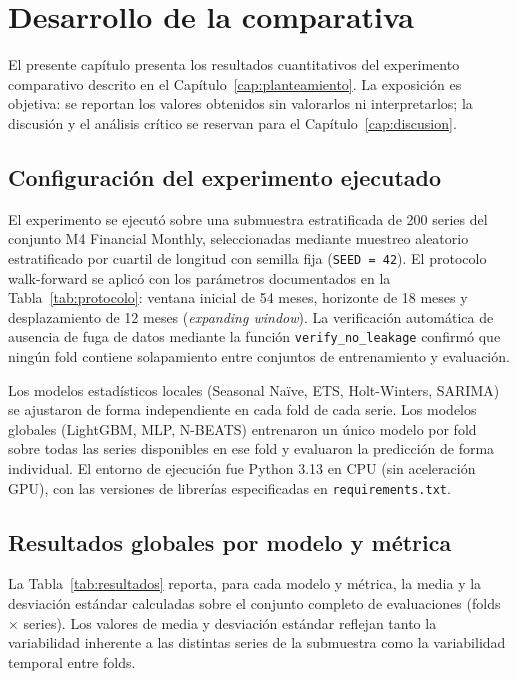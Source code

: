 \chapter{Desarrollo de la comparativa}
\label{cap:resultados}

El presente capítulo presenta los resultados cuantitativos del experimento comparativo descrito en el Capítulo~\ref{cap:planteamiento}. La exposición es objetiva: se reportan los valores obtenidos sin valorarlos ni interpretarlos; la discusión y el análisis crítico se reservan para el Capítulo~\ref{cap:discusion}.

\section{Configuración del experimento ejecutado}
\label{sec:configuracion_ejecucion}

El experimento se ejecutó sobre una submuestra estratificada de 200 series del conjunto M4 Financial Monthly, seleccionadas mediante muestreo aleatorio estratificado por cuartil de longitud con semilla fija (\texttt{SEED = 42}). El protocolo walk-forward se aplicó con los parámetros documentados en la Tabla~\ref{tab:protocolo}: ventana inicial de 54 meses, horizonte de 18 meses y desplazamiento de 12 meses (\textit{expanding window}). La verificación automática de ausencia de fuga de datos mediante la función \texttt{verify\_no\_leakage} confirmó que ningún fold contiene solapamiento entre conjuntos de entrenamiento y evaluación.

Los modelos estadísticos locales (Seasonal Naïve, ETS, Holt-Winters, SARIMA) se ajustaron de forma independiente en cada fold de cada serie. Los modelos globales (LightGBM, MLP, N-BEATS) entrenaron un único modelo por fold sobre todas las series disponibles en ese fold y evaluaron la predicción de forma individual. El entorno de ejecución fue Python 3.13 en CPU (sin aceleración GPU), con las versiones de librerías especificadas en \texttt{requirements.txt}.

\section{Resultados globales por modelo y métrica}
\label{sec:resultados_globales}

La Tabla~\ref{tab:resultados} reporta, para cada modelo y métrica, la media y la desviación estándar calculadas sobre el conjunto completo de evaluaciones (folds $\times$ series). Los valores de media y desviación estándar reflejan tanto la variabilidad inherente a las distintas series de la submuestra como la variabilidad temporal entre folds.


